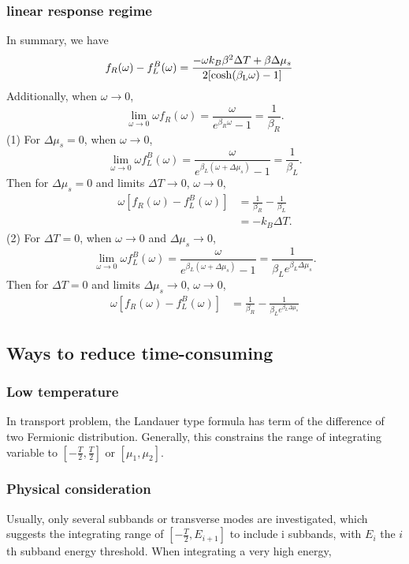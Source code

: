 \documentclass[aps,prb,superscriptaddress]{revtex4-2}
\begin{document}
\subsubsection{linear response regime}
In summary, we have
\begin{equation}
\begin{split}
f_{R}(\omega)-f_{L}^{B}(\omega) &= \frac{-\omega k_B\beta^2\Delta T + \beta\Delta\mu_s}{2[\rm{cosh}(\beta_{L}\omega)-1]}
\end{split}
\end{equation}
Additionally, when $\omega\to0$,
\[
\lim_{\omega\to0}\omega f_{R}(\omega) = \frac{\omega}{e^{\beta_{R}\omega}-1} = \frac{1}{\beta_R}.
\]
(1) For $\Delta\mu_s=0$, when $\omega\to0$,
\[
\lim_{\omega\to0}\omega f_{L}^{B}(\omega) = \frac{\omega}{e^{\beta_{L}(\omega+\Delta\mu_{s})}-1} = \frac{1}{\beta_L}.
\]
Then for $\Delta\mu_s=0$ and limits $\Delta T\to 0$, $\omega\to 0$,
\begin{equation}
\begin{split}
\omega[f_{R}(\omega)-f_{L}^{B}(\omega)] &= \frac{1}{\beta_R} - \frac{1}{\beta_L} \\
& = -k_B \Delta T.
\end{split}
\end{equation}
(2) For $\Delta T=0$, when $\omega\to0$ and $\Delta\mu_s\to 0$,
\[
\lim_{\omega\to0}\omega f_{L}^{B}(\omega) = \frac{\omega}{e^{\beta_{L}(\omega+\Delta\mu_{s})}-1} = \frac{1}{\beta_L e^{\beta_L \Delta\mu_s}}.
\]
Then for $\Delta T=0$ and limits $\Delta \mu_s\to 0$, $\omega\to 0$,
\begin{equation}
\begin{split}
\omega[f_{R}(\omega)-f_{L}^{B}(\omega)] &= \frac{1}{\beta_R} - \frac{1}{\beta_Le^{\beta_L \Delta\mu_s}} 
\end{split}
\end{equation}

\subsection{Ways to reduce time-consuming}
\subsubsection{Low temperature}
In transport problem, the Landauer type formula has term of the difference of two Fermionic distribution. Generally, this constrains the range of integrating variable to $[-\frac{T}{2}, \frac{T}{2}]$ or $[\mu_{1}, \mu_{2}]$.
\subsubsection{Physical consideration}
Usually, only several subbands or transverse modes are investigated, which suggests the integrating range of $[-\frac{T}{2}, E_{i+1}]$ to include i subbands, with $E_i$ the $i$th subband energy threshold. When integrating a very high energy, 
\end{document}

